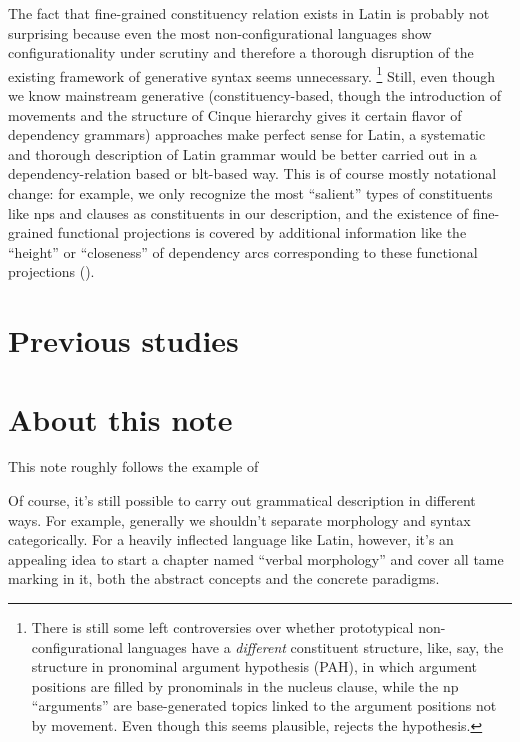 \documentclass[a4paper, oneside, 12pt]{report}
\begin{document}
{The fact that fine-grained constituency relation exists in Latin 
is probably not surprising because
even the most non-configurational languages show configurationality 
under scrutiny
\citep[among others]{niedzielski2017clausal,morris2018evidence,legate2002warlpiri}
and therefore a thorough disruption 
of the existing framework of generative syntax seems unnecessary.%
\footnote{
    There is still some left controversies over 
    whether prototypical non-configurational languages 
    have a \emph{different} constituent structure,
    like, say, the structure in pronominal argument hypothesis (PAH),
    in which argument positions are filled by pronominals 
    in the nucleus clause,
    while the \acs{np} ``arguments'' are base-generated topics 
    linked to the argument positions not by movement.
    Even though this seems plausible, 
    \cite{legate2002warlpiri} rejects the hypothesis.
}
Still, even though we know mainstream generative (constituency-based, 
though the introduction of movements and the structure of Cinque hierarchy
gives it certain flavor of dependency grammars) approaches make perfect sense for Latin,
a systematic and thorough description of Latin grammar 
would be better carried out in a dependency-relation based or \acs{blt}-based way.
This is of course mostly notational change:
for example, we only recognize the most ``salient'' types of constituents 
like \acs{np}s and clauses as constituents in our description,
and the existence of fine-grained functional projections is covered by 
additional information like the ``height'' or ``closeness'' of dependency arcs
corresponding to these functional projections
().

}

\section{Previous studies}

\section{About this note}

This note roughly follows the example of 

Of course, it's still possible to carry out grammatical description in different ways.  
For example, generally we shouldn't separate morphology and syntax categorically.
For a heavily inflected language like Latin, however, 
it's an appealing idea 
to start a chapter named ``verbal morphology''
and cover all \acs{tame} marking in it, 
both the abstract concepts and the concrete paradigms. 
\end{document}
